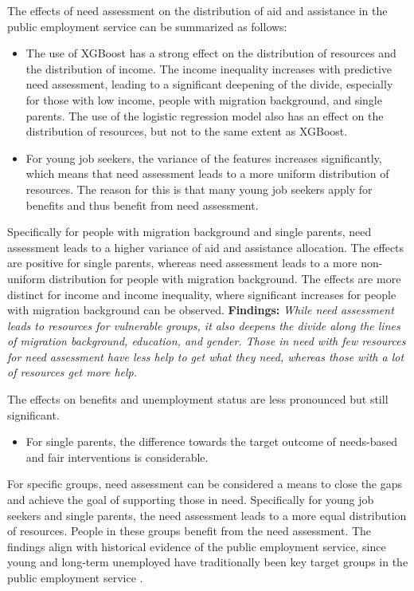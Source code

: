 The effects of need assessment on the distribution of aid and assistance in the public employment service can be summarized as follows:
\begin{itemize}
\item The use of XGBoost has a strong effect on the distribution of resources and the distribution of income. The income inequality increases with predictive need assessment, leading to a significant deepening of the divide, especially for those with low income, people with migration background, and single parents. The use of the logistic regression model also has an effect on the distribution of resources, but not to the same extent as XGBoost.
\item For young job seekers, the variance of the features increases significantly, which means that need assessment leads to a more uniform distribution of resources. The reason for this is that many young job seekers apply for benefits and thus benefit from need assessment.
\end{itemize}

Specifically for people with migration background and single parents, need assessment leads to a higher variance of aid and assistance allocation. The effects are positive for single parents, whereas need assessment leads to a more non-uniform distribution for people with migration background. The effects are more distinct for income and income inequality, where significant increases for people with migration background can be observed.
\textbf{Findings:} \emph{While need assessment leads to resources for vulnerable groups, it also deepens the divide along the lines of migration background, education, and gender. Those in need with few resources for need assessment have less help to get what they need, whereas those with a lot of resources get more help.}

The effects on benefits and unemployment status are less pronounced but still significant.
\begin{itemize}
\item For single parents, the difference towards the target outcome of needs-based and fair interventions is considerable.
\end{itemize}


For specific groups, need assessment can be considered a means to close the gaps and achieve the goal of supporting those in need. Specifically for young job seekers and single parents, the need assessment leads to a more equal distribution of resources. People in these groups benefit from the need assessment. The findings align with historical evidence of the public employment service, since young and long-term unemployed have traditionally been key target groups in the public employment service \cite{Kallus03042021, wirtz2019artificial}.

